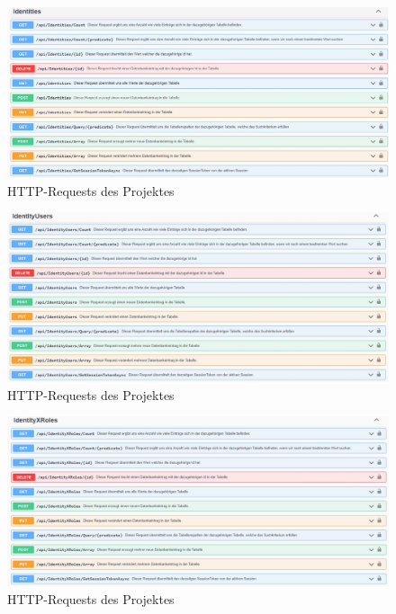 \begin{figure}[H]
    \centering
    \includegraphics[width=1.6\textwidth]{pics/WebApiRequests3.JPG}
    \caption{HTTP-Requests des Projektes}
\end{figure}

\begin{figure}[H]
    \centering
    \includegraphics[width=1.6\textwidth]{pics/WebApiRequests4.JPG}
    \caption{HTTP-Requests des Projektes}
\end{figure}

\begin{figure}[H]
    \centering
    \includegraphics[width=1.6\textwidth]{pics/WebApiRequests5.JPG}
    \caption{HTTP-Requests des Projektes}
\end{figure}

